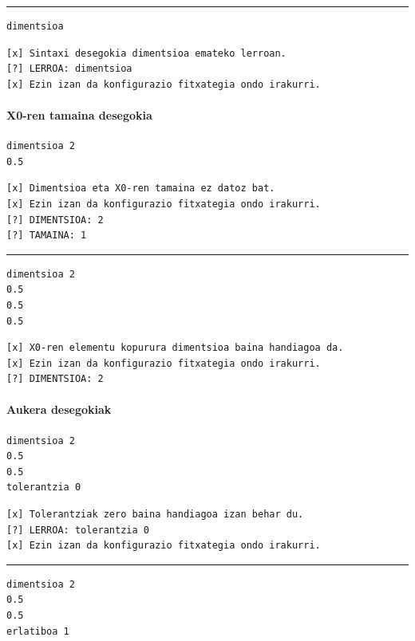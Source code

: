 \documentclass[10pt,a4paper,basque]{article}
\begin{document}
\rule{12cm}{0.4pt}

\begin{lstlisting}
dimentsioa
\end{lstlisting}

\begin{lstlisting}
[x] Sintaxi desegokia dimentsioa emateko lerroan.
[?] LERROA: dimentsioa
[x] Ezin izan da konfigurazio fitxategia ondo irakurri.
\end{lstlisting}

\paragraph{X0-ren tamaina desegokia}

\begin{lstlisting}
dimentsioa 2
0.5
\end{lstlisting}

\begin{lstlisting}
[x] Dimentsioa eta X0-ren tamaina ez datoz bat.
[x] Ezin izan da konfigurazio fitxategia ondo irakurri.
[?] DIMENTSIOA: 2
[?] TAMAINA: 1
\end{lstlisting}

\rule{12cm}{0.4pt}

\begin{lstlisting}
dimentsioa 2
0.5
0.5
0.5
\end{lstlisting}

\begin{lstlisting}
[x] X0-ren elementu kopurura dimentsioa baina handiagoa da.
[x] Ezin izan da konfigurazio fitxategia ondo irakurri.
[?] DIMENTSIOA: 2
\end{lstlisting}

\paragraph{Aukera desegokiak}

\begin{lstlisting}
dimentsioa 2
0.5
0.5
tolerantzia 0
\end{lstlisting}

\begin{lstlisting}
[x] Tolerantziak zero baina handiagoa izan behar du.
[?] LERROA: tolerantzia 0
[x] Ezin izan da konfigurazio fitxategia ondo irakurri.
\end{lstlisting}

\rule{12cm}{0.4pt}

\begin{lstlisting}
dimentsioa 2
0.5
0.5
erlatiboa 1
\end{lstlisting}
\end{document}

